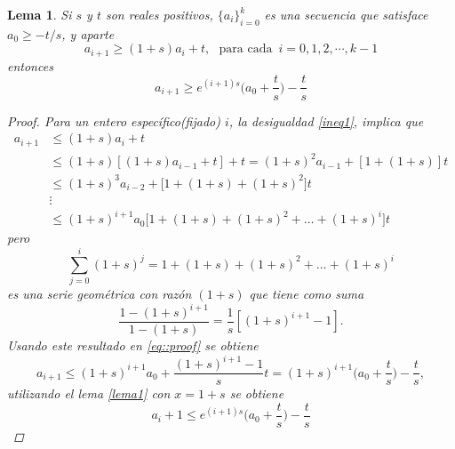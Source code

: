 \documentclass[a4paper]{article}
\newtheorem{lemma}{Lema}
\begin{document}
\begin{lemma}
Si $s$ y $t$ son reales positivos, $\{a_i\}_{i=0}^{k}$ es una secuencia que satisface $a_0\geq -t/s$, y aparte
\begin{equation}\label{ineq1}
a_{i+1}\geq (1+s)a_i + t, \,\,\,\, \text{para cada }\, i=0,1,2,\cdots, k-1
\end{equation}
entonces
\begin{equation*}
a_{i+1} \geq e^{(i+1)s}\bigg( a_0 +\frac{t}{s} \bigg)-\frac{t}{s}
\end{equation*}
\begin{proof}
Para un entero específico(fijado) $i$, la desigualdad  \ref{ineq1}, implica que 
\begin{equation}\label{eq::proof}
\begin{split}
a_{i+1} &\leq (1+s)a_i+t \\
&\leq (1+s)[(1+s)a_{i-1}+t]+t=(1+s)^2 a_{i-1}+[1+(1+s)]t\\
&\leq (1+s)^3 a_{i-2} +\big[ 1+(1+s)+(1+s)^2 \big]t\\
&\vdots\\
&\leq (1+s)^{i+1} a_0\big[ 1+(1+s)+(1+s)^2+\hdots+(1+s)^i\big]t
\end{split}
\end{equation}
pero
\begin{equation*}
\sum_{j=0}^{i}(1+s)^j=1+(1+s)+(1+s)^2+\hdots+(1+s)^i
\end{equation*}
es una serie geométrica con razón $(1+s)$ que tiene como suma
\begin{equation*}
\frac{1-(1+s)^{i+1}}{1-(1+s)}=\frac{1}{s}[(1+s)^{i+1}-1].
\end{equation*}
Usando este resultado en \ref{eq::proof} se obtiene
\begin{equation}
a_{i+1}\leq (1+s)^{i+1} a_0 + \frac{(1+s)^{i+1}-1}{s} t =(1+s)^{i+1}\bigg(a_0+\frac{t}{s}\bigg)-\frac{t}{s},
\end{equation}
utilizando el lema \ref{lema1} con $x=1+s$ se obtiene
\begin{equation}
a_i+1 \leq e^{(i+1)s}\bigg(a_0 + \frac{t}{s} \bigg) -\frac{t}{s}
\end{equation}
\end{proof}


\end{lemma}
\end{document}
